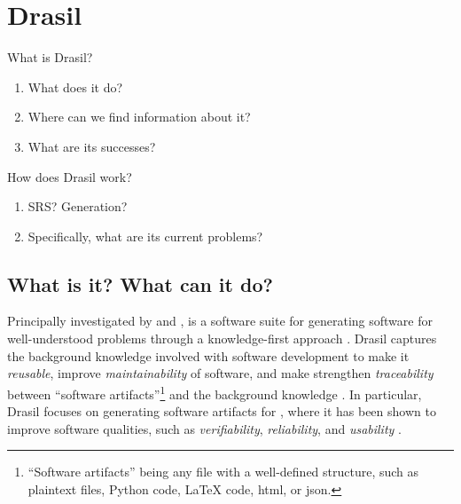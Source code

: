 \chapter{Drasil}
\label{chap:drasil}

\begin{writingdirectives}

      \item What is Drasil?
      \begin{enumerate}
            \item What does it do?
            \item Where can we find information about it?
            \item What are its successes?
      \end{enumerate}

      \item How does Drasil work?
      \begin{enumerate}
            \item SRS? Generation?
            \item Specifically, what are its current problems?
      \end{enumerate}

\end{writingdirectives}

\drasilLogoImg{}

\section{What is it? What can it do?}
\label{chap:drasil:sec:what-is-it}

Principally investigated by  and ,
 is a software suite
for generating software for well-understood problems through a knowledge-first
approach \cite{Drasil2021}. Drasil captures the background knowledge involved
with software development to make it \textit{reusable}, improve
\textit{maintainability} of software, and make strengthen \textit{traceability}
between ``software artifacts''\footnote{``Software artifacts'' being any file
with a well-defined structure, such as plaintext files, Python code, \LaTeX{}
code, \acs{html}, or \acs{json}.} and the background knowledge
\cite{SzymczakEtAl2016}. In particular, Drasil focuses on generating software
artifacts for , where it has been shown to improve software qualities,
such as \textit{verifiability}, \textit{reliability}, and \textit{usability}
\cite{Smith2018}.

